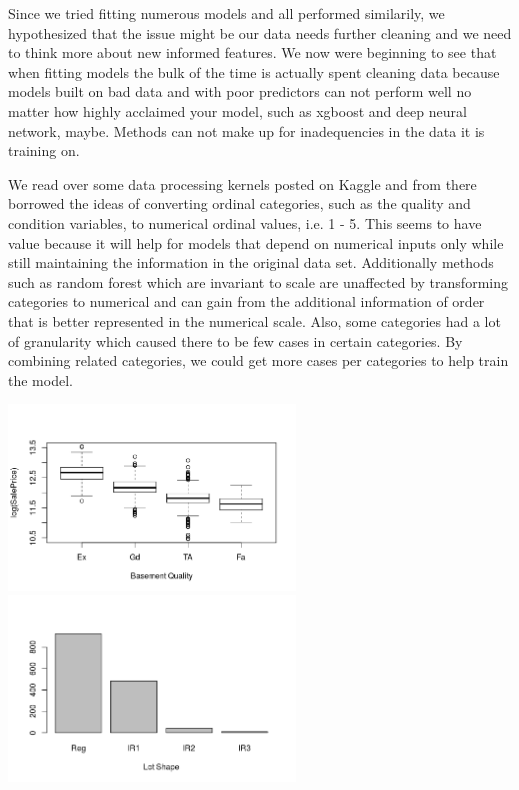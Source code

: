\documentclass[12pt]{article}
\begin{document}
Since we tried fitting numerous models and all performed similarily, we hypothesized that the issue might be our data needs further cleaning and we need to think more about new informed features. We now were beginning to see that when fitting models the bulk of the time is actually spent cleaning data because models built on bad data and with poor predictors can not perform well no matter how highly acclaimed your model, such as xgboost and deep neural network, maybe. Methods can not make up for inadequencies in the data it is training on.

We read over some data processing kernels posted on Kaggle and from there borrowed the ideas of converting ordinal categories, such as the quality and condition variables, to numerical ordinal values, i.e. 1 - 5. This seems to have value because it will help for models that depend on numerical inputs only while still maintaining the information in the original data set. Additionally methods such as random forest which are invariant to scale are unaffected by transforming categories to numerical and can gain from the additional information of order that is better represented in the numerical scale. Also, some categories had a lot of granularity which caused there to be few cases in certain categories.  By combining related categories, we could get more cases per categories to help train the model.  

\begin{center}
\includegraphics[width = 3in]{bsmtqual.png}
\includegraphics[width = 3in]{lotshape.png}
\end{center}
\end{document}
